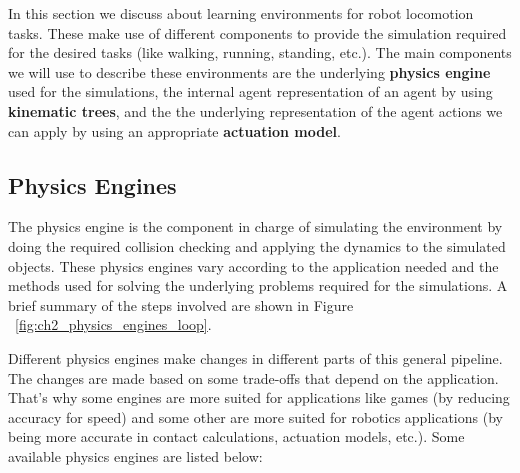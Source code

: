 In this section we discuss about learning environments for robot locomotion tasks.
These make use of different components to provide the simulation required for the desired
tasks (like walking, running, standing, etc.). The main components we will use
to describe these environments are the underlying \textbf{physics engine} used for the simulations, 
the internal agent representation of an agent by using \textbf{kinematic trees}, and the
the underlying representation of the agent actions we can apply by using an appropriate \textbf{actuation model}.

\subsection{Physics Engines} \label{subsec:physics_engines}

The physics engine is the component in charge of simulating the environment by doing the
required collision checking and applying the dynamics to the simulated objects. These
physics engines vary according to the application needed and the methods used for solving
the underlying problems required for the simulations. A brief summary of the steps involved are
shown in Figure ~\ref{fig:ch2_physics_engines_loop}.

\figPhysicsEngineLoop

Different physics engines make changes in different parts of this general pipeline.
The changes are made based on some trade-offs that depend on the application. That's
why some engines are more suited for applications like games (by reducing accuracy for speed)
and some other are more suited for robotics applications (by being more accurate in 
contact calculations, actuation models, etc.). Some available physics engines are 
listed below:

